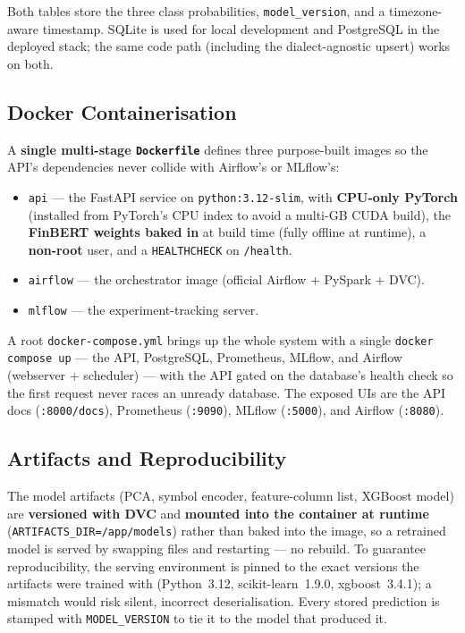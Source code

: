 \documentclass[11pt,a4paper]{article}
\begin{document}
Both tables store the three class probabilities, \texttt{model\_version}, and a
timezone-aware timestamp. SQLite is used for local development and PostgreSQL in
the deployed stack; the same code path (including the dialect-agnostic upsert)
works on both.

\subsection{Docker Containerisation}

A \textbf{single multi-stage \texttt{Dockerfile}} defines three purpose-built
images so the API's dependencies never collide with Airflow's or MLflow's:

\begin{itemize}[nosep]
  \item \texttt{api} --- the FastAPI service on \texttt{python:3.12-slim}, with
        \textbf{CPU-only PyTorch} (installed from PyTorch's CPU index to avoid a
        multi-GB CUDA build), the \textbf{FinBERT weights baked in} at build time
        (fully offline at runtime), a \textbf{non-root} user, and a
        \texttt{HEALTHCHECK} on \texttt{/health}.
  \item \texttt{airflow} --- the orchestrator image (official Airflow + PySpark + DVC).
  \item \texttt{mlflow} --- the experiment-tracking server.
\end{itemize}

A root \texttt{docker-compose.yml} brings up the whole system with a single
\texttt{docker compose up} --- the API, PostgreSQL, Prometheus, MLflow, and
Airflow (webserver + scheduler) --- with the API gated on the database's health
check so the first request never races an unready database. The exposed UIs are
the API docs (\texttt{:8000/docs}), Prometheus (\texttt{:9090}), MLflow
(\texttt{:5000}), and Airflow (\texttt{:8080}).

\subsection{Artifacts and Reproducibility}

The model artifacts (PCA, symbol encoder, feature-column list, XGBoost model)
are \textbf{versioned with DVC} and \textbf{mounted into the container at
runtime} (\texttt{ARTIFACTS\_DIR=/app/models}) rather than baked into the image,
so a retrained model is served by swapping files and restarting --- no rebuild.
To guarantee reproducibility, the serving environment is pinned to the exact
versions the artifacts were trained with (Python~3.12, scikit-learn~1.9.0,
xgboost~3.4.1); a mismatch would risk silent, incorrect deserialisation. Every
stored prediction is stamped with \texttt{MODEL\_VERSION} to tie it to the model
that produced it.
\end{document}
